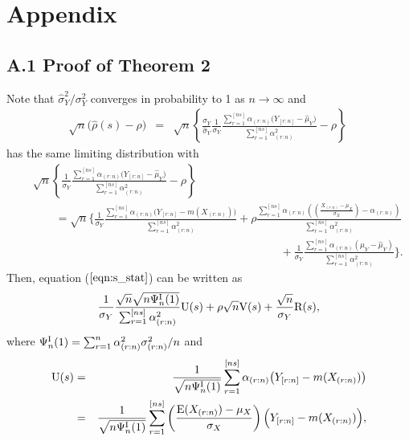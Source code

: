 \documentclass[12pt]{article}
\begin{document}
\section*{Appendix}

\subsection*{A.1 Proof of Theorem 2}

Note that $\widehat{\sigma}_Y^2/\sigma_Y^2$ converges in probability to 1 as $n \rightarrow \infty$ and 
\begin{eqnarray}
\sqrt{n} \big( \widehat{\rho}(s) - \rho \big) &=&
\sqrt{n} \left\{ \frac{\sigma_Y}{\widehat{\sigma}_Y}\frac{1}{\sigma_Y}
\frac{\sum_{r=1}^{[ns]}  \alpha_{(r:n)}  \big( Y_{[r:n]} - \widehat{\mu}_Y \big)}
{\sum_{r=1}^{[ns]} \alpha_{(r:n)}^2} - \rho \right\}  \nonumber\
\end{eqnarray} 
has the same limiting distribution with 
\begin{eqnarray} 
&& \sqrt{n} \left\{ \frac{1}{\sigma_Y}
\frac{\sum_{r=1}^{[ns]}  \alpha_{(r:n)}  \big( Y_{[r:n]} - \widehat{\mu}_Y \big)} 
{\sum_{r=1}^{[ns]} \alpha_{(r:n)}^2} - \rho \right\} \nonumber\\
&& \qquad = \sqrt{n} \Bigg\{  \frac{1}{\sigma_Y}   \frac{ \sum_{r=1}^{[ns]}
\alpha_{(r:n)} \big(Y_{[r:n]} - m (X_{(r:n)}) \big)} { \sum_{r=1}^{[ns]} \alpha_{(r:n)}^2 } 
+ \rho \frac{\sum_{r=1}^{[ns]} \alpha_{(r:n)} \left(\left(\frac{X_{(r:n)}-\mu_X}{\sigma_X}\right) - \alpha_{(r:n)} \right)}{\sum_{r=1}^{[ns]} \alpha_{(r:n)}^2} \nonumber \\
&& \qquad \qquad \qquad \qquad \qquad \qquad \qquad \qquad \qquad \qquad \qquad 
+\frac{1}{\sigma_Y}\frac{\sum_{r=1}^{[ns]}\alpha_{(r:n)}(\mu_Y-\widehat{\mu}_Y)}{\sum_{r=1}^{[ns]}\alpha_{(r:n)}^2} \Bigg\}.
\label{eqn:s_stat}
\end{eqnarray}
Then, equation ($\ref{eqn:s_stat}$) can be written as
\begin{equation}\nonumber
\frac{1}{\sigma_Y}\frac{\sqrt{n}\sqrt{n\Psi_n^{\rm I}(1)}}{\sum_{r=1}^{[ns]}\alpha_{(r:n)}^2}{\rm U}(s)+
\rho\sqrt{n}{\rm V}(s)+\frac{\sqrt{n}}{\sigma_Y}{\rm R}(s),
\end{equation}
where 
$\Psi_n^{\rm I}(1)=\sum_{r=1}^n\alpha_{(r:n)}^2\sigma_{(r:n)}^2/n$ and
\begin{eqnarray}
{\rm U}(s) &=& \frac{1}{\sqrt{n \Psi_n^{\rm I}(1)}}\sum_{r=1}^{[ns]} \alpha_{(r:n)} \big( Y_{[r:n]} - m (X_{(r:n)}) \big)
\nonumber\\
&=&
\frac{1}{\sqrt{n \Psi_n^{\rm I}(1) } }\sum_{r=1}^{[ns]}
\left( \frac{  {\rm E}( X_{(r:n)} ) -\mu_X} { \sigma_X}   \right) \Big( Y_{[r:n]} - m (X_{(r:n)}) \Big), \label{eqn:psum}
\end{eqnarray}
\end{document}
